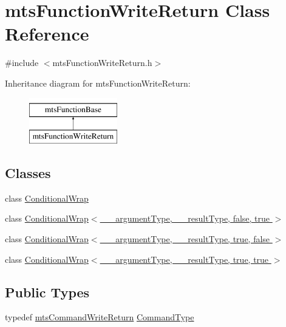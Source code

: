 \hypertarget{classmts_function_write_return}{\section{mts\-Function\-Write\-Return Class Reference}
\label{classmts_function_write_return}
}


{\ttfamily \#include $<$mts\-Function\-Write\-Return.\-h$>$}

Inheritance diagram for mts\-Function\-Write\-Return\-:\begin{figure}[H]
\begin{center}
\leavevmode
\includegraphics[height=2.000000cm]{d5/df9/classmts_function_write_return}
\end{center}
\end{figure}
\subsection*{Classes}
\begin{DoxyCompactItemize}
\item 
class \hyperlink{classmts_function_write_return_1_1_conditional_wrap}{Conditional\-Wrap}
\item 
class \hyperlink{classmts_function_write_return_1_1_conditional_wrap_3_01____argument_type_00_01____result_type_00_01false_00_01true_01_4}{Conditional\-Wrap$<$ \-\_\-\-\_\-argument\-Type, \-\_\-\-\_\-result\-Type, false, true $>$}
\item 
class \hyperlink{classmts_function_write_return_1_1_conditional_wrap_3_01____argument_type_00_01____result_type_00_01true_00_01false_01_4}{Conditional\-Wrap$<$ \-\_\-\-\_\-argument\-Type, \-\_\-\-\_\-result\-Type, true, false $>$}
\item 
class \hyperlink{classmts_function_write_return_1_1_conditional_wrap_3_01____argument_type_00_01____result_type_00_01true_00_01true_01_4}{Conditional\-Wrap$<$ \-\_\-\-\_\-argument\-Type, \-\_\-\-\_\-result\-Type, true, true $>$}
\end{DoxyCompactItemize}
\subsection*{Public Types}
\begin{DoxyCompactItemize}
\item 
typedef \hyperlink{classmts_command_write_return}{mts\-Command\-Write\-Return} \hyperlink{classmts_function_write_return_ac896d3571d680531a898daf398774881}{Command\-Type}
\end{DoxyCompactItemize}
